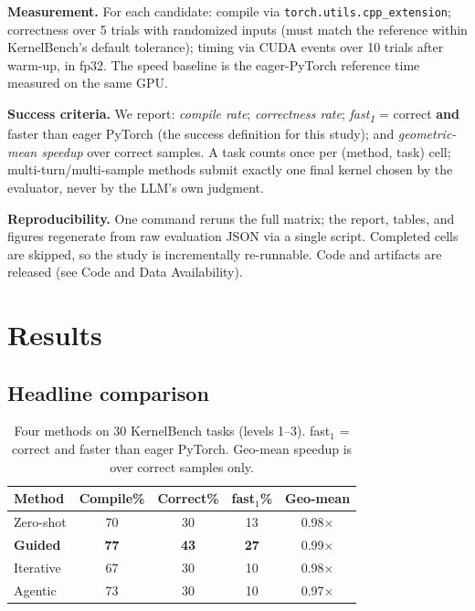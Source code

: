 \documentclass[conference]{IEEEtran}
\begin{document}
\textbf{Measurement.} For each candidate: compile via
\texttt{torch.utils.cpp\_extension}; correctness over 5 trials with randomized
inputs (must match the reference within KernelBench's default tolerance); timing
via CUDA events over 10 trials after warm-up, in fp32. The speed baseline is the
eager-PyTorch reference time measured on the same GPU.

\textbf{Success criteria.} We report: \emph{compile rate}; \emph{correctness rate};
\emph{fast\textsubscript{1}} = correct \textbf{and} faster than eager PyTorch (the
success definition for this study); and \emph{geometric-mean speedup} over correct
samples. A task counts once per (method, task) cell; multi-turn/multi-sample
methods submit exactly one final kernel chosen by the evaluator, never by the LLM's
own judgment.

\textbf{Reproducibility.} One command reruns the full matrix; the report, tables,
and figures regenerate from raw evaluation JSON via a single script. Completed cells
are skipped, so the study is incrementally re-runnable. Code and artifacts are
released (see Code and Data Availability).

\section{Results}

\subsection{Headline comparison}

\begin{table}[t]
\caption{Four methods on 30 KernelBench tasks (levels 1--3). fast$_1$ = correct and
faster than eager PyTorch. Geo-mean speedup is over correct samples only.}
\label{tab:headline}
\centering
\begin{tabular}{lcccc}
\toprule
Method & Compile\% & Correct\% & fast$_1$\% & Geo-mean \\
\midrule
Zero-shot   & 70 & 30 & 13 & 0.98$\times$ \\
\textbf{Guided} & \textbf{77} & \textbf{43} & \textbf{27} & 0.99$\times$ \\
Iterative   & 67 & 30 & 10 & 0.98$\times$ \\
Agentic     & 73 & 30 & 10 & 0.97$\times$ \\
\bottomrule
\end{tabular}
\end{table}
\end{document}
